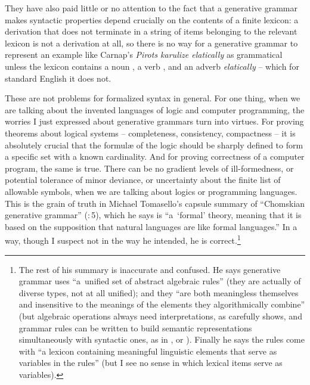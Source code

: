 \documentclass[output=paper]{langscibook}
\begin{document}
They have also paid little or no attention to the fact that a generative grammar makes syntactic properties depend crucially on the contents of a finite lexicon: a derivation that does not terminate in a string of items belonging to the relevant lexicon is not a derivation at all, so there is no way for a generative grammar to represent an example like Carnap's \textit{Pirots karulize elatically} as grammatical unless the lexicon contains a noun , a verb , and an adverb \textit{elatically} – which for standard English it does not.

These are not problems for formalized syntax in general. For one thing, when we are talking about the invented languages of logic and computer programming, the worries I just expressed about generative grammars turn into virtues. For proving theorems about logical systems – completeness, consistency, compactness – it is absolutely crucial that the formul{\ae} of the logic should be sharply defined to form a specific set with a known cardinality. And for proving correctness of a computer program, the same is true. There can be no gradient levels of ill-formedness, or potential tolerance of minor deviance, or uncertainty about the finite list of allowable symbols, when we are talking about logics or programming languages.  This is the grain of truth in Michael Tomasello's capsule summary of ``Chomskian generative grammar'' (\citeyear{Tomasello03}:\,5), which he says is ``a~`formal' theory, meaning that it is based on the supposition that natural languages are like formal languages.'' In a way, though I suspect not in the way he intended, he is correct.\footnote{The rest of his summary is inaccurate and confused. He says generative grammar uses ``a~unified set of abstract algebraic rules'' (they are actually of diverse types, not at all unified); and they ``are both meaningless themselves and insensitive to the meanings of the elements they algorithmically combine'' (but algebraic operations always need interpretations, as \citealt{McCawley68BASE} carefully shows, and grammar rules can be written to build semantic representations simultaneously with syntactic ones, as in \citealt{Montague73PTQ},      \citealt{Montague74} or \citealt{GaKlPuSa85}). Finally he says the rules come with ``a lexicon containing meaningful linguistic elements that      serve as variables in the rules'' (but I see no sense in which lexical items serve as variables).}
\end{document}
